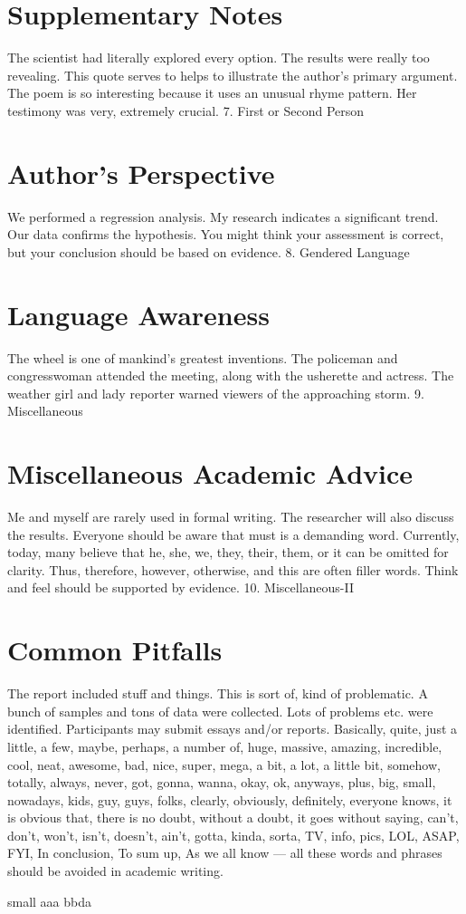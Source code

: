 \section{Supplementary Notes}
The scientist had literally explored every option. The results were really too revealing. This quote serves to helps to illustrate the author’s primary argument. The poem is so interesting because it uses an unusual rhyme pattern. Her testimony was very, extremely crucial.
7. First or Second Person
\section{Author's Perspective}
We performed a regression analysis. My research indicates a significant trend. Our data confirms the hypothesis. You might think your assessment is correct, but your conclusion should be based on evidence.
8. Gendered Language
\section{Language Awareness}
The wheel is one of mankind’s greatest inventions. The policeman and congresswoman attended the meeting, along with the usherette and actress. The weather girl and lady reporter warned viewers of the approaching storm.
9. Miscellaneous
\section{Miscellaneous Academic Advice}
Me and myself are rarely used in formal writing. The researcher will also discuss the results. Everyone should be aware that must is a demanding word. Currently, today, many believe that he, she, we, they, their, them, or it can be omitted for clarity. Thus, therefore, however, otherwise, and this are often filler words. Think and feel should be supported by evidence.
10. Miscellaneous-II
\section{Common Pitfalls}
The report included stuff and things. This is sort of, kind of problematic. A bunch of samples and tons of data were collected. Lots of problems etc. were identified. Participants may submit essays and/or reports. Basically, quite, just a little, a few, maybe, perhaps, a number of, huge, massive, amazing, incredible, cool, neat, awesome, bad, nice, super, mega, a bit, a lot, a little bit, somehow, totally, always, never, got, gonna, wanna, okay, ok, anyways, plus, big, small, nowadays, kids, guy, guys, folks, clearly, obviously, definitely, everyone knows, it is obvious that, there is no doubt, without a doubt, it goes without saying, can't, don't, won't, isn't, doesn't, ain't, gotta, kinda, sorta, TV, info, pics, LOL, ASAP, FYI, In conclusion, To sum up, As we all know — all these words and phrases should be avoided in academic writing.

small
aaa \small bbda

\big
